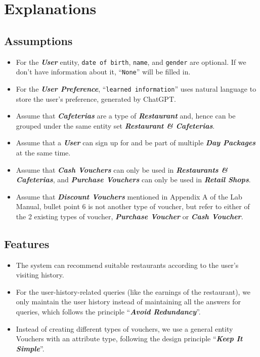 
\chapter*{Explanations}

\section*{Assumptions}

\begin{itemize}
	\item For the \textbf{\textit{User}} entity, \texttt{date of birth}, \texttt{name}, and \texttt{gender} are optional. If we don’t have information about it, ``\texttt{None}'' will be filled in.
	\item For the \textit{\textbf{User Preference}}, ``\texttt{learned information}'' uses natural language to store the user’s preference, generated by ChatGPT.
	\item Assume that \textit{\textbf{Cafeterias}} are a type of \textit{\textbf{Restaurant}} and, hence can be grouped under the same entity set \textit{\textbf{Restaurant \& Cafeterias}}.
	\item Assume that a \textit{\textbf{User}} can sign up for and be part of multiple \textit{\textbf{Day Packages}} at the same time.
	\item Assume that \textit{\textbf{Cash Vouchers}} can only be used in \textit{\textbf{Restaurants \& Cafeterias}}, and \textit{\textbf{Purchase Vouchers}} can only be used in \textit{\textbf{Retail Shops}}.
	\item Assume that \textit{\textbf{Discount Vouchers}} mentioned in Appendix A of the Lab Manual, bullet point 6 is not another type of voucher, but refer to either of the 2 existing types of voucher, \textit{\textbf{Purchase Voucher}} or \textit{\textbf{Cash Voucher}}.
\end{itemize}

\section*{Features}

\begin{itemize}
	\item The system can recommend suitable restaurants according to the user's visiting history.
	\item For the user-history-related queries (like the earnings of the restaurant), we only maintain the user history instead of maintaining all the answers for queries, which follows the principle ``\textit{\textbf{Avoid Redundancy}}''.
	\item Instead of creating different types of vouchers, we use a general entity Vouchers with an attribute type, following the design principle ``\textit{\textbf{Keep It Simple}}''.
\end{itemize}